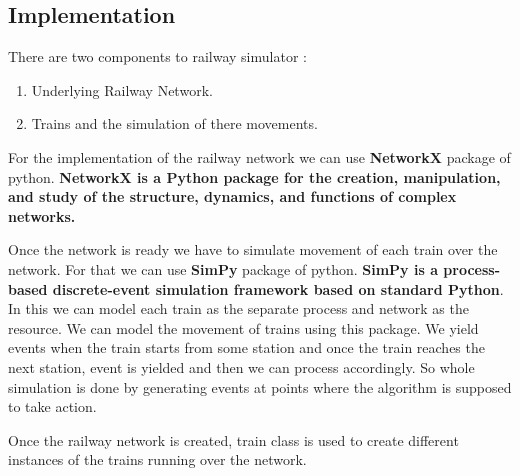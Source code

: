 \subsection{Implementation}
There are two components to railway simulator :
\begin{enumerate}
    \item Underlying Railway Network. 
    \item Trains and the simulation of there movements.
\end{enumerate}

For the implementation of the railway network we can use \textbf{NetworkX}\cite{WEBSITE:4} package of python.
\textbf{NetworkX is a Python package for the creation, manipulation,
and study of the structure, dynamics, and functions of complex networks.}
\vspace{1.5cm}

Once the network is ready we have to simulate movement of each train over the network. For 
that we can use \textbf{SimPy}\cite{WEBSITE:5} package of python. \textbf{SimPy is a process-based discrete-event simulation framework based on standard Python}.
In this we can model each train as the separate process and network as the resource. We can 
model the movement of trains using this package. We yield events when the train starts from some station and once 
the train reaches the next station, event is yielded and then we can process accordingly. So whole simulation is done 
by generating events at points where the algorithm is supposed to take action.

\vspace{\baselineskip}
Once the railway network is created, train class is used to create different instances
of the trains running over the network.
